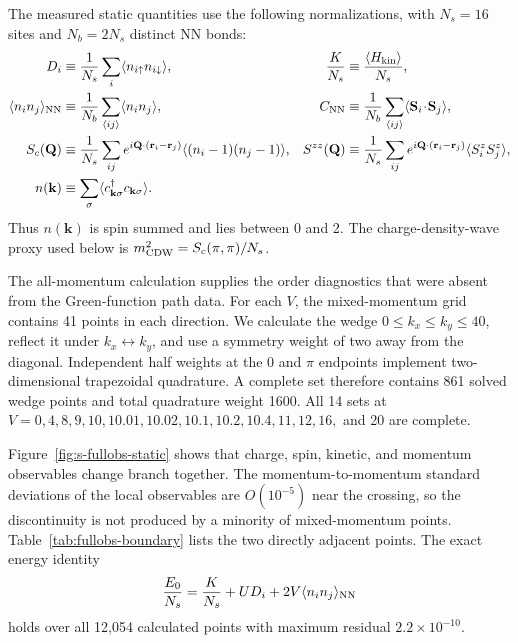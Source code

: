 \documentclass[10pt]{article}
\begin{document}
The measured static quantities use the following normalizations, with $N_s=16$ sites and $N_b=2N_s$ distinct NN bonds:
\begin{align}
 D_i&\equiv\frac1{N_s}\sum_i\langle n_{i\uparrow}n_{i\downarrow}\rangle,
 &\frac{K}{N_s}&\equiv\frac{\langle H_{\rm kin}\rangle}{N_s},\nonumber\\
 \langle n_i n_j\rangle_{\rm NN}
 &\equiv\frac1{N_b}\sum_{\langle ij\rangle}\langle n_i n_j\rangle,
 &C_{\rm NN}&\equiv\frac1{N_b}\sum_{\langle ij\rangle}
 \langle\mathbf S_i\!\cdot\!\mathbf S_j\rangle,
 \label{eq:s-static-local-definitions}\\
 S_c(\mathbf Q)&\equiv\frac1{N_s}\sum_{ij}e^{i\mathbf Q\cdot(\mathbf r_i-\mathbf r_j)}
 \langle(n_i-1)(n_j-1)\rangle,
 &S^{zz}(\mathbf Q)&\equiv\frac1{N_s}\sum_{ij}e^{i\mathbf Q\cdot(\mathbf r_i-\mathbf r_j)}
 \langle S_i^zS_j^z\rangle,\nonumber\\
 n(\mathbf k)&\equiv\sum_\sigma\langle c^\dagger_{\mathbf k\sigma}c_{\mathbf k\sigma}\rangle.
 &&
 \label{eq:s-static-structure-definitions}
\end{align}
Thus $n(\mathbf k)$ is spin summed and lies between 0 and 2. The charge-density-wave proxy used below is $m_{\rm CDW}^2=S_c(\pi,\pi)/N_s$.

The all-momentum calculation supplies the order diagnostics that were absent from the Green-function path data. For each $V$, the mixed-momentum grid contains 41 points in each direction. We calculate the wedge $0\le k_x\le k_y\le40$, reflect it under $k_x\leftrightarrow k_y$, and use a symmetry weight of two away from the diagonal. Independent half weights at the $0$ and $\pi$ endpoints implement two-dimensional trapezoidal quadrature. A complete set therefore contains 861 solved wedge points and total quadrature weight 1600. All 14 sets at $V=0,4,8,9,10,10.01,10.02,10.1,10.2,10.4,11,12,16,$ and 20 are complete.

Figure~\ref{fig:s-fullobs-static} shows that charge, spin, kinetic, and momentum observables change branch together. The momentum-to-momentum standard deviations of the local observables are $O(10^{-5})$ near the crossing, so the discontinuity is not produced by a minority of mixed-momentum points. Table~\ref{tab:fullobs-boundary} lists the two directly adjacent points. The exact energy identity
\begin{equation}
 \frac{E_0}{N_s}=\frac{K}{N_s}+UD_i+2V\langle n_i n_j\rangle_{\rm NN}
 \label{eq:s-energy-identity}
\end{equation}
holds over all 12,054 calculated points with maximum residual $2.2\times10^{-10}$.
\end{document}
